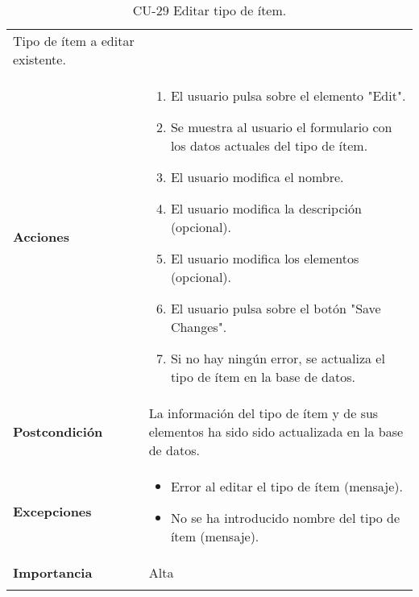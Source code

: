 \begin{longtable}[]{@{}ll@{}}
\begin{minipage}[t]{0.75\columnwidth}
Tipo de ítem a editar existente.\strut
\end{minipage}\tabularnewline
\begin{minipage}[t]{0.20\columnwidth}\raggedright
\textbf{Acciones}\strut
\end{minipage} & \begin{minipage}[t]{0.75\columnwidth}\raggedright
\begin{enumerate}
\def\labelenumi{\arabic{enumi}.}
\tightlist
\item
  El usuario pulsa sobre el elemento "Edit".
\item
  Se muestra al usuario el formulario con los datos actuales del tipo de
  ítem.
\item
  El usuario modifica el nombre.
\item
  El usuario modifica la descripción (opcional).
\item
  El usuario modifica los elementos (opcional).
\item
  El usuario pulsa sobre el botón "Save Changes".
\item
  Si no hay ningún error, se actualiza el tipo de ítem en la base de
  datos.
\end{enumerate}\strut
\end{minipage}\tabularnewline
\begin{minipage}[t]{0.20\columnwidth}\raggedright
\textbf{Postcondición}\strut
\end{minipage} & \begin{minipage}[t]{0.75\columnwidth}\raggedright
La información del tipo de ítem y de sus elementos ha sido sido
actualizada en la base de datos.\strut
\end{minipage}\tabularnewline
\begin{minipage}[t]{0.20\columnwidth}\raggedright
\textbf{Excepciones}\strut
\end{minipage} & \begin{minipage}[t]{0.75\columnwidth}\raggedright
\begin{itemize}
\tightlist
\item
  Error al editar el tipo de ítem (mensaje).
\item
  No se ha introducido nombre del tipo de ítem (mensaje).
\end{itemize}\strut
\end{minipage}\tabularnewline
\begin{minipage}[t]{0.20\columnwidth}\raggedright
\textbf{Importancia}\strut
\end{minipage} & \begin{minipage}[t]{0.75\columnwidth}\raggedright
Alta\strut
\end{minipage}\tabularnewline
\bottomrule
\caption{CU-29 Editar tipo de ítem.}
\end{longtable}

